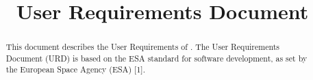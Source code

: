 

\title{User Requirements Document}

\newcommand{\TitelAbbr}{SQAP}
\newcommand{\Version}{0.0}



\maketitle

\begin{abstract}
This document describes the User Requirements of \projectname. The User Requirements Document (URD) is based on the ESA standard for software development, as set by the European Space Agency (ESA) [1].
\end{abstract}

\tableofcontents












